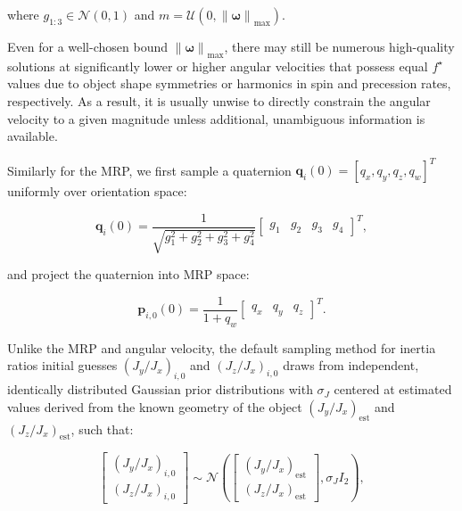 \documentclass[a4paper,twocolumn]{spaceDebrisC} %
\newcommand{\vctr}[1]{\bm{#1}}
\newcommand{\norm}[1]{\left\lVert#1\right\rVert}
\begin{document}
\noindent
where $g_{1:3} \in \mathcal{N}(0,1)$ and $m=\mathcal{U}(0,\norm{\vctr{\omega}}_\text{max})$.

Even for a well-chosen bound $\norm{\vctr{\omega}}_\text{max}$, there may still be numerous high-quality solutions at significantly lower or higher angular velocities that possess equal $f^\star$ values due to object shape symmetries or harmonics in spin and precession rates, respectively. As a result, it is usually unwise to directly constrain the angular velocity to a given magnitude unless additional, unambiguous information is available.

Similarly for the MRP, we first sample a quaternion $\vctr{q}_i(0) = [q_x, q_y, q_z, q_w]^T$ uniformly over orientation space:

\begin{equation}
  \vctr{q}_i(0) = \frac{1}{\sqrt{g_1^2 + g_2^2 + g_3^2 + g_4^2}} \begin{bmatrix} g_1 & g_2 & g_3 & g_4 \end{bmatrix}^T,
\end{equation}

\noindent
and project the quaternion into MRP space:

\begin{equation} \label{eq:mrp_sampler}
  \vctr{p}_{i,0}(0) = \frac{1}{1 + q_w} \begin{bmatrix} q_x & q_y & q_z \end{bmatrix}^T.
\end{equation}

Unlike the MRP and angular velocity, the default sampling method for inertia ratios initial guesses $\left(J_y / J_x\right)_{i,0}$ and $\left(J_z / J_x\right)_{i,0}$ draws from independent, identically distributed Gaussian prior distributions with $\sigma_J$ centered at estimated values derived from the known geometry of the object $\left(J_y / J_x\right)_\text{est}$ and $\left(J_z / J_x\right)_\text{est}$, such that:

\begin{equation}
  \begin{bmatrix}
    \left(J_y / J_x\right)_{i,0} \\ \left(J_z / J_x\right)_{i,0}
  \end{bmatrix} \sim \mathcal{N} \left(\begin{bmatrix}
    \left(J_y / J_x\right)_\text{est} \\
    \left(J_z / J_x\right)_\text{est} \end{bmatrix}, \sigma_J I_2 \right),
\end{equation}
\end{document}
